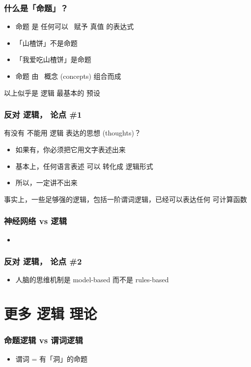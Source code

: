 \documentclass[15pt]{beamer}
\begin{document}
\begin{frame}
\frametitle{什么是「命题」？}
\begin{itemize}
	\item 命题 是 任何可以 {\color{red}\ 赋予 真值} 的表达式
	\item 「山楂饼」不是命题
	\item 「我爱吃山楂饼」是命题
	\item 命题 由 {\color{red}\ 概念} (concepts) 组合而成
\end{itemize}
以上似乎是 逻辑 最基本的 预设
\end{frame}

\begin{frame}
\frametitle{反对 逻辑， 论点 \#1}
有没有 不能用 逻辑 表达的思想 (thoughts)？
\begin{itemize}
\item 如果有，你必须把它用文字表述出来
\item 基本上，任何语言表述 可以 转化成 逻辑形式
\item 所以，一定讲不出来
\end{itemize}
事实上，一些足够强的逻辑，包括一阶谓词逻辑，已经可以表达任何 可计算函数
\end{frame}

\begin{frame}
\frametitle{神经网络 vs 逻辑}
\begin{itemize}
	\item 
\end{itemize}
\end{frame}

\begin{frame}
\frametitle{反对 逻辑， 论点 \#2}
\begin{itemize}
	\item 人脑的思维机制是 model-based 而不是 rules-based
\end{itemize}
\end{frame}

\section[Section]{更多 逻辑 理论}
\frame{\sectionpage}

\begin{frame}
\frametitle{命题逻辑 vs 谓词逻辑}
\begin{itemize}
	\item 谓词 = 有「洞」的命题
\end{itemize}
\end{frame}
\end{document}
